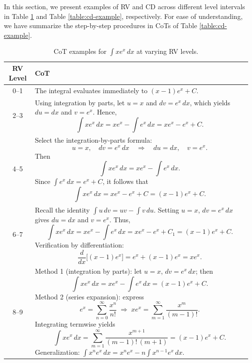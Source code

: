 \documentclass{article}
\begin{document}
\label{sec:cotsample}
In this section, we present examples of RV and CD across different level intervals in Table \ref{table:rv-example} and Table \ref{table:cd-example}, respectively.
For ease of understanding, we have summarize the step-by-step procedures in CoTs of Table \ref{table:cd-example}.


\begin{table}[ht]
\centering
\caption{CoT examples for \(\displaystyle \int x e^x\,dx\) at varying RV levels.}
\begin{tabular}{|c|p{12cm}|}
\hline
RV Level & CoT \\
\hline
0–1 & The integral evaluates immediately to \((x-1)e^x + C\). \\
\hline
2–3 & Using integration by parts, let \(u=x\) and \(dv=e^x\,dx\), which yields \(du=dx\) and \(v=e^x\). Hence,  
\[
\int x e^x\,dx = x e^x - \int e^x\,dx = x e^x - e^x + C.
\] \\
\hline
4–5 & Select the integration-by-parts formula:  
\[
u = x,\quad dv = e^x\,dx
\quad\Longrightarrow\quad
du = dx,\quad v = e^x.
\]  
Then  
\[
\int x e^x\,dx = x e^x - \int e^x\,dx.
\]  
Since \(\int e^x\,dx = e^x + C\), it follows that  
\[
\int x e^x\,dx = x e^x - e^x + C = (x-1)e^x + C.
\] \\
\hline
6–7 & Recall the identity \(\int u\,dv = uv - \int v\,du\). Setting \(u=x\), \(dv=e^x\,dx\) gives \(du=dx\) and \(v=e^x\). Thus,  
\[
\int x e^x\,dx = x e^x - \int e^x\,dx = x e^x - e^x + C_1 = (x-1)e^x + C.
\]  
Verification by differentiation:  
\[
\frac{d}{dx}\bigl[(x-1)e^x\bigr] = e^x + (x-1)e^x = x e^x.
\] \\
\hline
8–9 & Method 1 (integration by parts): let \(u=x\), \(dv=e^x\,dx\); then  
\[
\int x e^x\,dx = x e^x - \int e^x\,dx = (x-1)e^x + C.
\]  
Method 2 (series expansion): express  
\[
e^x = \sum_{n=0}^\infty \frac{x^n}{n!}
\;\Longrightarrow\;
x e^x = \sum_{m=1}^\infty \frac{x^m}{(m-1)!}.
\]  
Integrating termwise yields  
\[
\int x e^x\,dx = \sum_{m=1}^\infty \frac{x^{m+1}}{(m-1)!\,(m+1)} = (x-1)e^x + C.
\]  
Generalization: \(\displaystyle \int x^n e^x\,dx = x^n e^x - n\int x^{n-1}e^x\,dx.\) \\
\hline
\end{tabular}
\label{table:rv-example}
\end{table}
\end{document}
